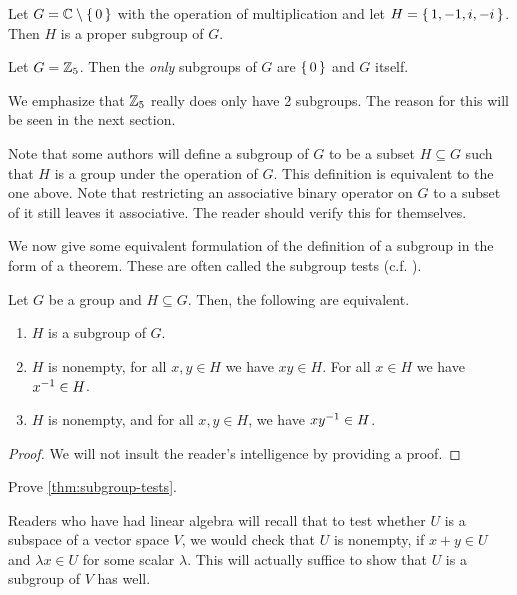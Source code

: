 \documentclass[./main.tex]{subfiles}
\begin{document}
\begin{example}
    Let $G = \mathbb{C} \setminus \set{0}$ with the operation of multiplication and let
    $H = \set{1, -1, i, -i}$. Then $H$ is a proper subgroup of $G$.
\end{example}

\begin{example}
    Let $G = \mathbb{Z}_5$. Then the \emph{only} subgroups of $G$ are $\set{0}$ and $G$ itself.
\end{example}
We emphasize that $\mathbb{Z}_5$ really does only have 2 subgroups. The reason for this
will be seen in the next section.


Note that some authors will define a subgroup of $G$ to be a subset $H \subseteq
G$ such that $H$ is a group under the operation of $G$. This definition is
equivalent to the one above. Note that restricting an associative binary
operator on $G$ to a subset of it still leaves it associative. The reader should
verify this for themselves.

We now give some equivalent formulation of the definition of a subgroup in the
form of a theorem. These are often called the subgroup tests (c.f. \cite{Gallian_2020}).
\begin{theorem}
\label{thm:subgroup-tests}
    Let $G$ be a group and $H \subseteq G$. Then, the following are equivalent.
    \begin{enumerate}
        \item $H$ is a subgroup of $G$.
        \item $H$ is nonempty, for all $x ,y \in H$ we have $xy \in H$. For all
        $x \in H$ we have $x ^{-1} \in H$.
        \item $H$ is nonempty, and for all $x,y \in H$, we have $xy^{-1} \in H$.
    \end{enumerate}
\end{theorem}
\begin{proof}
    We will not insult the reader's intelligence by providing a proof.
\end{proof}
\begin{exercise}
    Prove \cref{thm:subgroup-tests}.
\end{exercise}

Readers who have had linear algebra will recall that to test whether $U$ is a
subspace of a vector space $V$, we would check that $U$ is nonempty, if $x + y
\in U$ and $\lambda x \in U$ for some scalar $\lambda$. This will actually
suffice to show that $U$ is a subgroup of $V$ has well. 
\end{document}
